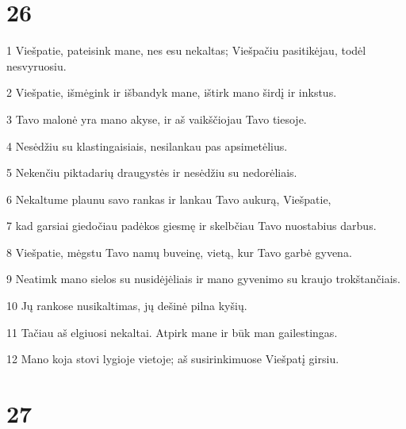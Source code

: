 \chapter{26}


\par 1 Viešpatie, pateisink mane, nes esu nekaltas; Viešpačiu pasitikėjau, todėl nesvyruosiu. 
\par 2 Viešpatie, išmėgink ir išbandyk mane, ištirk mano širdį ir inkstus. 
\par 3 Tavo malonė yra mano akyse, ir aš vaikščiojau Tavo tiesoje. 
\par 4 Nesėdžiu su klastingaisiais, nesilankau pas apsimetėlius. 
\par 5 Nekenčiu piktadarių draugystės ir nesėdžiu su nedorėliais. 
\par 6 Nekaltume plaunu savo rankas ir lankau Tavo aukurą, Viešpatie, 
\par 7 kad garsiai giedočiau padėkos giesmę ir skelbčiau Tavo nuostabius darbus. 
\par 8 Viešpatie, mėgstu Tavo namų buveinę, vietą, kur Tavo garbė gyvena. 
\par 9 Neatimk mano sielos su nusidėjėliais ir mano gyvenimo su kraujo trokštančiais. 
\par 10 Jų rankose nusikaltimas, jų dešinė pilna kyšių. 
\par 11 Tačiau aš elgiuosi nekaltai. Atpirk mane ir būk man gailestingas. 
\par 12 Mano koja stovi lygioje vietoje; aš susirinkimuose Viešpatį girsiu.



\chapter{27}


